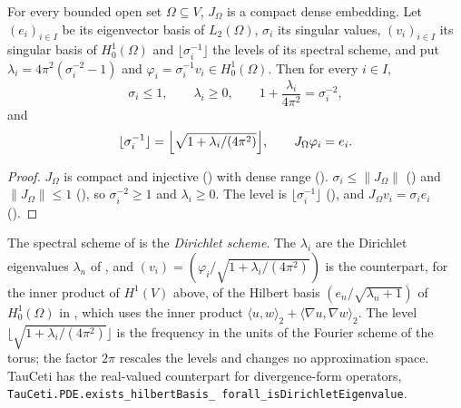 \begin{theorem}
\label{thm:dirichlet-eigenbasis}
\leanok
{}
For every bounded open set $\Omega \subseteq V$, $J_\Omega$ is a compact dense embedding. Let
$(e_i)_{i \in I}$ be its eigenvector basis of $L_2(\Omega)$, $\sigma_i$ its singular values,
$(v_i)_{i \in I}$ its singular basis of $H^1_0(\Omega)$ and $\lfloor \sigma_i^{-1} \rfloor$ the
levels of its spectral scheme, and put $\lambda_i = 4\pi^2 (\sigma_i^{-2} - 1)$ and
$\varphi_i = \sigma_i^{-1} v_i \in H^1_0(\Omega)$. Then for every $i \in I$,
\[
  \sigma_i \leq 1, \qquad \lambda_i \geq 0, \qquad
  1 + \frac{\lambda_i}{4\pi^2} = \sigma_i^{-2},
\]
and
\[
  \lfloor \sigma_i^{-1} \rfloor = \Bigl\lfloor \sqrt{1 + \lambda_i/(4\pi^2)} \Bigr\rfloor,
  \qquad
  J_\Omega \varphi_i = e_i .
\]
\end{theorem}

\begin{proof}
\leanok
$J_\Omega$ is compact and injective () with dense range
(). $\sigma_i \leq \|J_\Omega\|$ () and
$\|J_\Omega\| \leq 1$ (), so $\sigma_i^{-2} \geq 1$ and
$\lambda_i \geq 0$. The level is $\lfloor \sigma_i^{-1} \rfloor$
(), and
$J_\Omega v_i = \sigma_i e_i$ ().
\end{proof}

The spectral scheme of  is the \emph{Dirichlet scheme}. The
$\lambda_i$ are the Dirichlet eigenvalues $\lambda_n$ of
\cite[Theorem~9.31, p.~311]{Brezis2011}, and
$(v_i) = (\varphi_i/\sqrt{1 + \lambda_i/(4\pi^2)})$ is the counterpart, for the inner product of
$H^1(V)$ above, of the Hilbert basis $(e_n/\sqrt{\lambda_n + 1})$ of $H^1_0(\Omega)$ in
\cite[Remark~28, p.~311]{Brezis2011}, which uses the inner product
$\langle u, w \rangle_2 + \langle \nabla u, \nabla w \rangle_2$. The level
$\lfloor \sqrt{1 + \lambda_i/(4\pi^2)} \rfloor$ is the frequency in the units of the Fourier
scheme of the torus; the factor $2\pi$ rescales the levels and changes no approximation space.
TauCeti \cite{TauCeti} has the real-valued counterpart for divergence-form operators,
\texttt{TauCeti.\allowbreak PDE.\allowbreak exists\_\allowbreak hilbertBasis\_\allowbreak
forall\_\allowbreak isDirichletEigenvalue}.

